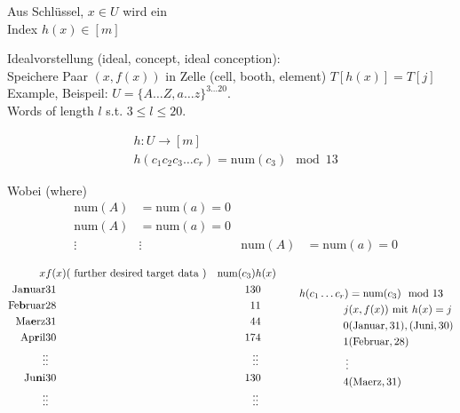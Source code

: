 \documentclass[10pt]{amsart}
\begin{document}
Aus Schl\"{u}ssel, $x\in U$ wird ein \\
Index $h(x) \in [m]$

Idealvorstellung (ideal, concept, ideal conception): \\
Speichere Paar $(x, f(x))$ in Zelle (cell, booth, element) $T[h(x)] = T[j]$ \\

Example, Beispeil: $U = \lbrace A \dots Z, a\dots z \rbrace^{3 \dots 20}$. \\
Words of length $l$ s.t. $3\leq l \leq 20$.

\[
\begin{aligned}
& h : U \to [m] \\
& h(c_1c_2 c_3 \dots c_r) = \text{num}(c_3) \mod{ 13}
\end{aligned}
\]

Wobei (where) 
\[
\begin{aligned}
& \text{num}{(A)} &= \text{num}{(a)} = 0 \\
& \text{num}{(A)} &= \text{num}{(a)} = 0 \\
& \vdots & \vdots 
& \text{num}{(A)} &= \text{num}{(a)} = 0 
\end{aligned}
\]

\[
\begin{gathered}
\begin{aligned} 
x & f(x) (\text{ further desired target data }) & \text{num}(c_3) & h(x) \\
\text{Ja\textbf{n}uar} & 31 & 13 & 0 \\
\text{Fe\textbf{b}ruar} & 28 & 1 & 1 \\
\text{Ma\textbf{e}rz} & 31 & 4 & 4 \\
\text{Ap\textbf{r}il} & 30 & 17 & 4 \\
\vdots & \vdots & \vdots & \vdots \\ 
\text{Ju\textbf{n}i} & 30 & 13 & 0 \\
\vdots & \vdots & \vdots & \vdots 
\end{aligned} 
\quad \quad \, 
\begin{aligned}
h(c_1 \dots c_r) & = \text{num}(c_3) \mod{13} \\
j & (x,f(x)) \text{ mit } h(x) = j \\ 
0 & (\text{Januar}, 31), (\text{Juni}, 30) \\
1 & (\text{Februar}, 28) \\
\vdots & \\
4 & (\text{Maerz}, 31) 
\end{aligned}
\end{gathered}
\]
\end{document}

